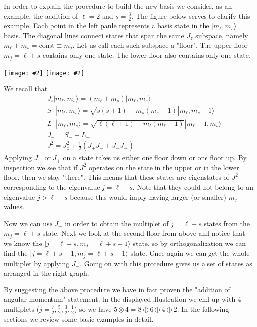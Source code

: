 \documentclass[onecolumn,fleqn, 11pt]{revtex4}
\newcommand{\const}{\mathrm{const}}
\newcommand{\putgraph}[2][0.30\hsize]{\texttt{[image: \#2]}}
\newcommand{\beq}{\begin{eqnarray}}
\newcommand{\eeq}{\end{eqnarray}}
\begin{document}
In order to explain the procedure to build the new basis 
we consider, as an example, the addition of $\ell=2$ and 
$s=\frac{3}{2}$. The figure below serves to clarify 
this example. Each point in the left panle represents a basis
state in the $|m_{\ell},m_s\rangle$ basis. 
The diagonal lines connect states that span the same $J_z$ subspace, 
namely ${m_{\ell}+m_s=\const \equiv m_j}$. 
Let us call each such subspace a "floor". The upper floor 
$m_j=\ell+s$ contains only one state. The lower floor 
also contains only one state.

\begin{center}
\putgraph[0.45\hsize]{AngularMomentuml2s32msmlGraph}
\hspace*{0.08\hsize}
\putgraph[0.35\hsize]{AngularMomentuml2s32jmjGraph}
\end{center}

We recall that 
\beq
&& J_z|m_{\ell},m_s\rangle = (m_{\ell}+m_s) |m_{\ell},m_s\rangle \\
&& S_{-}|m_{\ell},m_s\rangle = \sqrt{s(s+1)-m_s(m_s-1)} |m_{\ell},m_s-1\rangle \\
&& L_{-}|m_{\ell},m_s\rangle = \sqrt{\ell(\ell+1)-m_{\ell}(m_{\ell}-1)} |m_{\ell}-1,m_s\rangle \\ 
&& J_{-} = S_{-} + L_{-} \\
&& J^{2} = J_{z}^{2} + \frac{1}{2} (J_{+}J_{-}+J_{-}J_{+}) 
\eeq
Applying  $J_{-}$ or $J_{+}$ on a state takes us either 
one floor down or one floor up.
By inspection we see that if $J^2$ operates on the state 
in the upper or in the lower floor, then we stay "there". 
This means that these states are eigenstates of $J^2$ 
corresponding to the eigenvalue $j=\ell+s$. Note that 
they could not belong to an eigenvalue $j>\ell+s$ 
because this would imply having larger (or smaller) $m_j$ values.

Now we can use $J_{-}$ in order to obtain the multiplet 
of $j=\ell+s$ states from the $m_{j}=\ell+s$ state. 
Next we look at the second 
floor from above and notice that we know 
the $|j=\ell+s,m_j=\ell+s-1\rangle$ state, 
so by orthogonalization we can find the 
$|j=\ell+s-1,m_j=\ell+s-1\rangle$ state. 
Once again we can get the whole multiplet 
by applying $J_{-}$. Going on with this procedure 
gives us a set of states as arranged in the 
right graph. 

By suggesting the above procedure we have in fact proven  
the "addition of angular momentum" statement.
In the displayed illustration we end up with 4 multiplets 
($j=\frac{7}2,\frac{5}2,\frac{3}2,\frac{1}2$) 
so we have $5\otimes4=8\oplus6\oplus4\oplus2$. 
In the following sections we review some basic examples in detail. 
\end{document}
